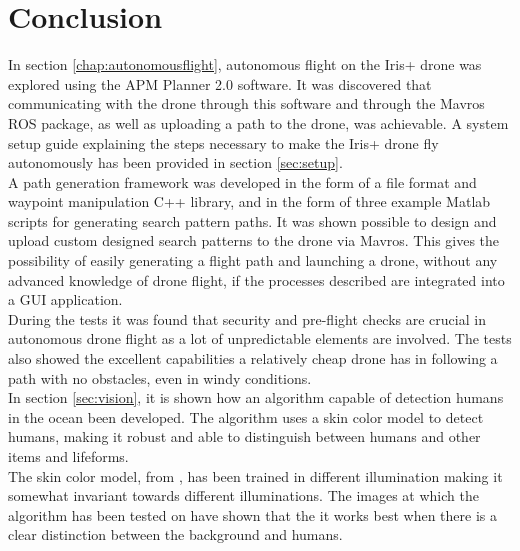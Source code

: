 \chapter{Conclusion}

In section \ref{chap:autonomousflight}, autonomous flight on the Iris+ drone was explored using the APM Planner 2.0 software.
It was discovered that communicating with the drone through this software and through the Mavros ROS package,
as well as uploading a path to the drone, was achievable.
A system setup guide explaining the steps necessary to make the Iris+ drone fly autonomously has been provided in section \ref{sec:setup}.
\\
A path generation framework was developed in the form of a file format and waypoint manipulation C++ library,
and in the form of three example Matlab scripts for generating search pattern paths.
It was shown possible to design and upload custom designed search patterns to the drone via Mavros.
This gives the possibility of easily generating a flight path and launching a drone, without any advanced knowledge of drone flight,
if the processes described are integrated into a GUI application.\\

During the tests it was found that security and pre-flight checks are crucial in autonomous drone flight
as a lot of unpredictable elements are involved.
The tests also showed the excellent capabilities a relatively cheap drone has in following a path with no obstacles, even in windy conditions.\\

In section \ref{sec:vision}, it is shown how an algorithm capable of detection humans in the ocean been developed. 
The algorithm uses a skin color model to detect humans, making it robust and able to distinguish between humans and other items and lifeforms.\\
 
The skin color model, from \cite{Ref:SkinDetection}, has been trained in different illumination
making it somewhat invariant towards different illuminations.
The images at which the algorithm has been tested on have shown
that the it works best when there is a
clear distinction between the background and humans.
\newpage